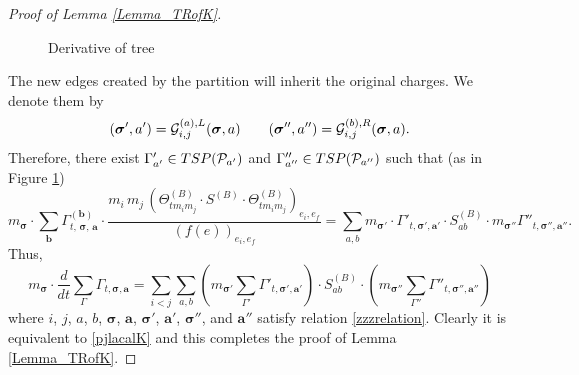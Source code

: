 \documentclass[10pt,reqno]{article}
\theoremstyle{plain} %
\theoremstyle{remark}
\numberwithin{equation}{section}
\begin{document}
\begin{proof}[Proof of Lemma \ref{Lemma_TRofK}]
\begin{figure}[h!]
{\begin{minipage}{0.45\textwidth}
\begin{tikzpicture}
 \end{tikzpicture}
  

   \end{minipage}
 
}
  \caption{Derivative of tree}
    \label{fig:hexagons}
\end{figure}

 
 
The new edges created by the partition will inherit the original charges. We denote them by 
\begin{equation}
\label{zzzrelation}
(\boldsymbol{\sigma}', \textbf{a}')= {\cal G}^{(a), L}_{i, j}(\boldsymbol{\sigma}, \textbf{a}) \quad\quad 
(\boldsymbol{\sigma}'', \textbf{a}'')={\cal G}^{(b), R}_{i, j}(\boldsymbol{\sigma}, \textbf{a}).
\end{equation}
Therefore, there exist 
$\Gamma'_{\textbf{a}'}\in TSP({\cal P}_{\textbf{a}'})$ and $ \Gamma''_{\textbf{a}''}\in TSP({\cal P}_{\textbf{a}''})$  such that (as in Figure \ref{fig:hexagons})
$$
  m_{\boldsymbol{\sigma}}\cdot \sum_{\textbf{b}}\Gamma^{(\textbf{b})}_{t, \,\boldsymbol{\sigma}
       ,\, \textbf{a}}
       \cdot \frac{m_i \,m_j \,\left(\Theta^{(B)}_{t m_i m_j} \cdot S^{(B)} \cdot \Theta^{(B)}_{t m_i m_j}\right)_{e_i,e_f}}{\left(f(e)\right)_{e_i,e_f}}     = \sum_{a, b} 
        m_{\boldsymbol{\sigma}'}\cdot \Gamma'_{t, \boldsymbol{\sigma}', \textbf{a}'} \cdot S^{(B)}_{ab} \cdot 
         m_{\boldsymbol{\sigma}''}\Gamma''_{t, \boldsymbol{\sigma}'', \textbf{a}''}.
$$
Thus,
$$
 m_{\boldsymbol{\sigma}}\cdot \frac{d}{dt} \sum_{\Gamma} \Gamma_{t, \boldsymbol{\sigma}, \textbf{a}} = \sum_{i < j} \sum_{a, b} \left(m_{\boldsymbol{\sigma}'}\sum_{\Gamma'} \Gamma'_{t, \boldsymbol{\sigma}', \textbf{a}'}\right) \cdot S^{(B)}_{ab} \cdot \left(m_{\boldsymbol{\sigma}''}\sum_{\Gamma''} \Gamma''_{t, \boldsymbol{\sigma}'', \textbf{a}''}\right)
$$
where $i$, $j$, $a$, $b$, $\boldsymbol{\sigma}$, $\textbf{a}$, $\boldsymbol{\sigma}'$, $\textbf{a}'$, $\boldsymbol{\sigma}''$, and $\textbf{a}''$ satisfy relation \eqref{zzzrelation}. Clearly it is equivalent to \eqref{pjlacalK} and this completes the proof of Lemma  \ref{Lemma_TRofK}.  

 \end{proof}
\end{document}
